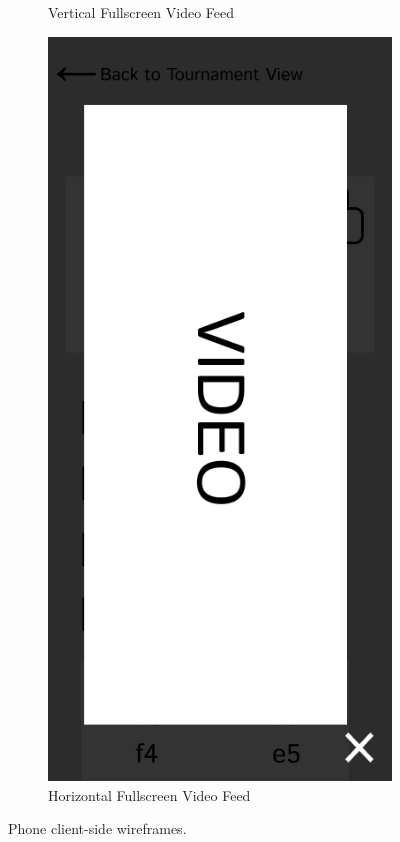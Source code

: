 \begin{figure}[h!]
\begin{subfigure}[h!]{0.2\linewidth}
        \caption{Vertical Fullscreen Video Feed}
        \label{fig:phone-fullscreen-video-vertical}
    \end{subfigure}
    \hfill
    \begin{subfigure}[h!]{0.2\linewidth}
        \centering
        \includegraphics[width=\linewidth]{figures/methods/wireframes/phone-full-screen-video-view-horizontal.png}
        \caption{Horizontal Fullscreen Video Feed}
        \label{fig:phone-fullscreen-video-horizontal}
    \end{subfigure}
    
    \caption[Phone client-side wireframes]{Phone client-side wireframes.}
    \label{fig:phone-view-group}
\end{figure}

